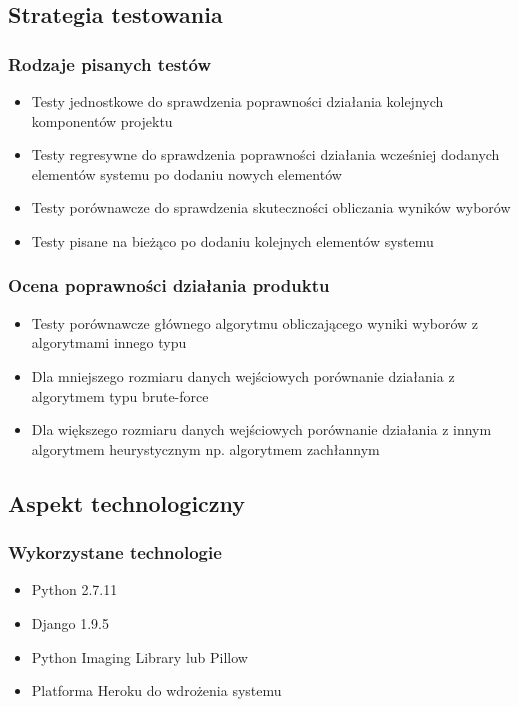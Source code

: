 \documentclass{beamer}
\begin{document}
\subsection{Strategia testowania}

\begin{frame}

\frametitle{Rodzaje pisanych testów}
\begin{itemize}
\item Testy jednostkowe do sprawdzenia poprawności działania kolejnych komponentów projektu
\item Testy regresywne do sprawdzenia poprawności działania wcześniej dodanych elementów systemu po dodaniu nowych elementów
\item Testy porównawcze do sprawdzenia skuteczności obliczania wyników wyborów
\item Testy pisane na bieżąco po dodaniu kolejnych elementów systemu
\end{itemize}

\end{frame}

\begin{frame}

\frametitle{Ocena poprawności działania produktu}
\begin{itemize}
\item Testy porównawcze głównego algorytmu obliczającego wyniki wyborów z algorytmami innego typu
\item Dla mniejszego rozmiaru danych wejściowych porównanie działania z algorytmem typu brute-force
\item Dla większego rozmiaru danych wejściowych porównanie działania z innym algorytmem heurystycznym np. algorytmem zachłannym
\end{itemize}

\end{frame}

\subsection{Aspekt technologiczny}

\begin{frame}

\frametitle{Wykorzystane technologie}
\begin{itemize}
\item Python 2.7.11
\item Django 1.9.5
\item Python Imaging Library lub Pillow
\item Platforma Heroku do wdrożenia systemu
\end{itemize}

\end{frame}
\end{document}

